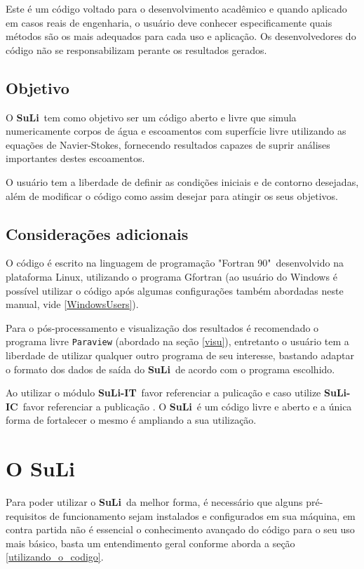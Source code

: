 \documentclass[12pt, a4paper]{article}
\newcommand{\SL}{{\bf SuLi}}
\newcommand{\SLIT}{{\bf SuLi-IT}}
\newcommand{\SLIC}{{\bf SuLi-IC}}
\begin{document}
Este é um código voltado para o desenvolvimento acadêmico e quando aplicado em casos reais de engenharia, o usuário deve conhecer especificamente quais métodos são os mais adequados para cada uso e aplicação. Os desenvolvedores do código não se responsabilizam perante os resultados gerados.

\subsection{Objetivo}
O \SL\ tem como objetivo ser um código aberto e livre que simula numericamente corpos de água e escoamentos com superfície livre utilizando as equações de Navier-Stokes, fornecendo resultados capazes de suprir análises importantes destes escoamentos. 

O usuário tem a liberdade de definir as condições iniciais e de contorno desejadas, além de modificar o código como assim desejar para atingir os seus objetivos.


\subsection{Considerações adicionais}
O código é escrito na linguagem de programação "Fortran 90"\ desenvolvido na plataforma Linux, utilizando o programa Gfortran (ao usuário do Windows é possível utilizar o código após algumas configurações também abordadas neste manual, vide \ref{WindowsUsers}).

Para o pós-processamento e visualização dos resultados é recomendado o programa livre \verb|Paraview| (abordado na seção \ref{visu}), entretanto o usuário tem a liberdade de utilizar qualquer outro programa de seu interesse, bastando adaptar o formato dos dados de saída do \SL\ de acordo com o programa escolhido.

Ao utilizar o módulo \SLIT\ favor referenciar a pulicação \cite{monteiro2014} e caso utilize \SLIC\ favor referenciar a publicação \cite{monteiro2019}. O \SL\ é um código livre e aberto e a única forma de fortalecer o mesmo é ampliando a sua utilização.
\newpage

\section{O SuLi}
Para poder utilizar o \SL\ da melhor forma, é necessário que alguns pré-requisitos de funcionamento sejam instalados e configurados em sua máquina, em contra partida não é essencial o conhecimento avançado do código para o seu uso mais básico, basta um entendimento geral conforme aborda a seção \ref{utilizando_o_codigo}.
\end{document}
